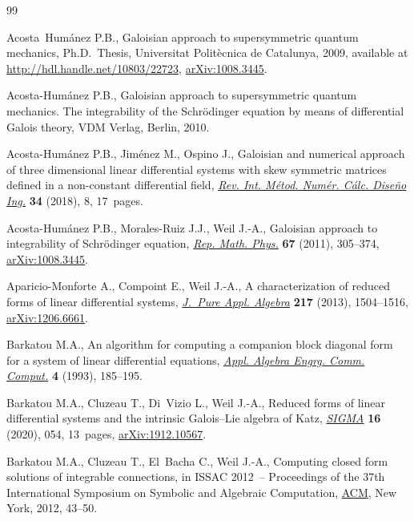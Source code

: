 \begin{thebibliography}{99}
\footnotesize\itemsep=0pt

Acosta~Hum\'anez P.B., Galoisian approach to supersymmetric quantum mechanics,
 Ph.D.~Thesis, {U}niversitat Polit\`ecnica de Catalunya, 2009, available at
 \url{http://hdl.handle.net/10803/22723}, \href{https://arxiv.org/abs/1008.3445}{arXiv:1008.3445}.

Acosta-Hum\'anez P.B., Galoisian approach to supersymmetric quantum mechanics.
 The integrability of the Schr\"odinger equation by means of differential
 Galois theory, {VDM} Verlag, Berlin, 2010.

Acosta-Hum\'anez P.B., Jim\'enez M., Ospino J., Galoisian and numerical
 approach of three dimensional linear differential systems with skew symmetric
 matrices defined in a non-constant differential field, \href{https://doi.org/10.23967/j.rimni.2017.7.008}{\textit{Rev. Int.
 M\'etod. Num\'er. C\'alc. Dise\~no Ing.}} \textbf{34} (2018), 8, 17~pages.

Acosta-Hum\'anez P.B., Morales-Ruiz J.J., Weil J.-A., Galoisian approach to
 integrability of {S}chr\"odinger equation, \href{https://doi.org/10.1016/S0034-4877(11)60019-0}{\textit{Rep. Math. Phys.}}
 \textbf{67} (2011), 305--374, \href{https://arxiv.org/abs/1008.3445}{arXiv:1008.3445}.

Aparicio-Monforte A., Compoint E., Weil J.-A., A characterization of reduced
 forms of linear differential systems, \href{https://doi.org/10.1016/j.jpaa.2012.11.007}{\textit{J.~Pure Appl. Algebra}}
 \textbf{217} (2013), 1504--1516, \href{https://arxiv.org/abs/1206.6661}{arXiv:1206.6661}.

Barkatou M.A., An algorithm for computing a companion block diagonal form for a
 system of linear differential equations, \href{https://doi.org/10.1007/BF01202037}{\textit{Appl. Algebra Engrg. Comm.
 Comput.}} \textbf{4} (1993), 185--195.

Barkatou M.A., Cluzeau T., Di~Vizio L., Weil J.-A., Reduced forms of linear
 differential systems and the intrinsic {G}alois--{L}ie algebra of {K}atz,
 \href{https://doi.org/10.3842/SIGMA.2020.054}{\textit{SIGMA}} \textbf{16} (2020), 054, 13~pages, \href{https://arxiv.org/abs/1912.10567}{arXiv:1912.10567}.

Barkatou M.A., Cluzeau T., El~Bacha C., Weil J.-A., Computing closed form
 solutions of integrable connections, in I{SSAC} 2012~-- {P}roceedings of the
 37th {I}nternational {S}ymposium on {S}ymbolic and {A}lgebraic {C}omputation,
 \href{https://doi.org/10.1145/2442829.2442840}{ACM}, New York, 2012, 43--50.


\end{thebibliography}
